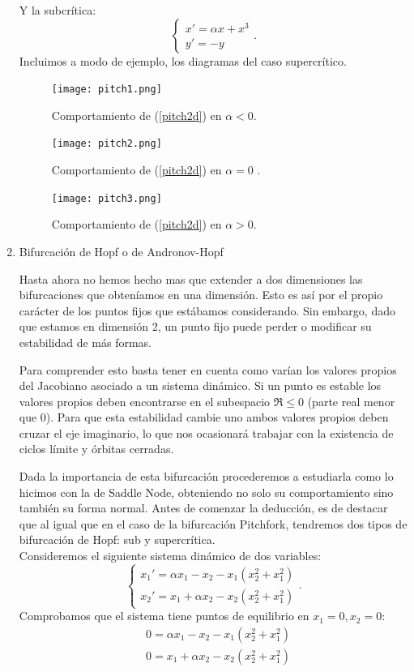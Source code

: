 \begin{enumerate}
\begin{equation}
	\end{equation}
	Y la subcrítica:
	\begin{equation}
	\left\{\begin{matrix}x'=\alpha x+x^3 \\y'=-y\end{matrix}\right..
	\end{equation}
	Incluimos a modo de ejemplo, los diagramas del caso supercrítico.
	\begin{figure}[H]
		\centering
		\texttt{[image: pitch1.png]}
		\caption{Comportamiento de (\ref{pitch2d}) en $\alpha<0$. }
	\end{figure}
	\begin{figure}[H]
		\centering
		\texttt{[image: pitch2.png]}
		\caption{Comportamiento de (\ref{pitch2d}) en $\alpha=0$ .}
	\end{figure}
	\begin{figure}[H]
		\centering
		\texttt{[image: pitch3.png]}
		\caption{Comportamiento de (\ref{pitch2d}) en $\alpha>0$. }
	\end{figure}
	
	\item Bifurcación de Hopf o de Andronov-Hopf
	
	Hasta ahora no hemos hecho mas que extender a dos dimensiones las bifurcaciones que obteníamos en una dimensión. Esto es así por el propio carácter de los puntos fijos que estábamos considerando. Sin embargo, dado que estamos en dimensión 2, un punto fijo puede perder o modificar su estabilidad de más formas. 
	
	 Para comprender esto basta tener en cuenta como varían los valores propios del Jacobiano asociado a un sistema dinámico. Si un punto es estable los valores propios deben encontrarse en el subespacio $\Re \leq0$ (parte real menor que 0). Para que esta estabilidad cambie uno  ambos valores propios deben cruzar el eje imaginario, lo que nos ocasionará trabajar con la existencia de ciclos límite y órbitas cerradas.
	 
	Dada la importancia de esta bifurcación procederemos a estudiarla como lo hicimos con la de Saddle Node, obteniendo no solo su comportamiento sino también su forma normal. Antes de comenzar la deducción, es de destacar que al igual que en el caso de la bifurcación Pitchfork, tendremos dos tipos de bifurcación de Hopf: sub y supercrítica.\\
	Consideremos el siguiente sistema dinámico de dos variables:
	 \[ \left \{ \begin{matrix} x_1'=\alpha x_1-x_2-x_1(x_2^2+x_1^2)\\ x_2'=x_1+\alpha x_2-x_2(x_2^2+x_1^2)\end{matrix}\right.. \]
	Comprobamos que el sistema tiene puntos de equilibrio en $ x_1=0, x_2=0$:
	\begin{equation}
	\begin{split}
	&0=\alpha x_1-x_2-x_1(x_2^2+x_1^2) \\&
	0=x_1+\alpha x_2-x_2(x_2^2+x_1^2)\end{split} 
	\end{equation}
	

\end{enumerate}

